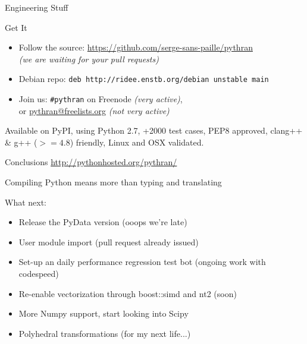 \documentclass[aspectratio=1610]{beamer}
\begin{document}
\begin{frame}{Engineering Stuff}
    \begin{block}{Get It}
        \begin{itemize}
            \item Follow the source: \url{https://github.com/serge-sans-paille/pythran} \\ \textit{(we are waiting for your pull requests)}
            \item Debian repo: \texttt{deb http://ridee.enstb.org/debian unstable main}
            \item Join us: \texttt{\#pythran} on Freenode 
            \textit{(very active)}, \\ or \url{pythran@freelists.org} 
            \textit{(not very active)}
        \end{itemize}
    \end{block}

    Available on PyPI, using Python 2.7, +2000 test cases, PEP8 approved, clang++ \& g++ ($>=4.8$) friendly, Linux and OSX validated.
\end{frame}

\begin{frame}{Conclusions}
    \hfill\tiny{\url{http://pythonhosted.org/pythran/}}
    \normalsize
    \begin{center}
        \vfill
        Compiling Python means more than typing and translating\\
        \vfill
         {
        What next: 
        \begin{itemize}
          \item<+-> Release the PyData version (ooops we're late)
          \item<+-> User module import (pull request already issued)
          \item<+-> Set-up an daily performance regression test bot (ongoing work with codespeed)
          \item<+-> Re-enable vectorization through boost::simd and nt2 (soon)
          \item<+-> More Numpy support, start looking into Scipy
          \item<+-> Polyhedral transformations (for my next life...)
        \end{itemize}
        }
        \vfill
        \vfill
    \end{center}
\end{frame}
\end{document}

